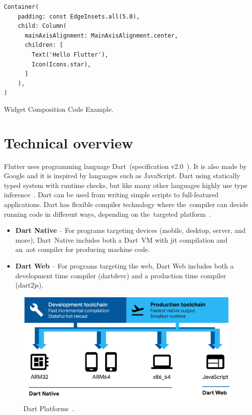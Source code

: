 \begin{listing}[ht]
\begin{verbatim}
Container(
    padding: const EdgeInsets.all(5.0),
    child: Column(
      mainAxisAlignment: MainAxisAlignment.center,
      children: [
        Text('Hello Flutter'),
        Icon(Icons.star),
      ]
    ),
)
\end{verbatim}
\caption{Widget Composition Code Example.}
\label{listing:hello-flutter}
\end{listing}
\section{Technical overview}
Flutter uses programming language Dart~(specification v2.0~\cite{dart-specs}). It is also made by Google and it is inspired by languages such as JavaScript. Dart using statically typed system with runtime checks, but like many other languages highly use type inference~\cite{dart-type-system}. Dart can be used from writing simple scripts to full-featured applications. Dart has flexible compiler technology where the~compiler can decide running code in different ways, depending on the~targeted platform~\cite{dart-platforms}. 

\begin{itemize}
    \item \textbf{Dart Native} -- For programs targeting devices (mobile, desktop, server, and more), Dart~Native includes both a Dart~VM with \gls{jit} compilation and an~\gls{aot} compiler for producing machine code.
    \item \textbf{Dart Web} -- For programs targeting the web, Dart Web includes both a development time compiler (dartdevc) and a production time compiler (dart2js).
\end{itemize}

\begin{figure}[htp]
    \centering
    \includegraphics[width=0.8\linewidth]{img/flutter/dart-platforms.pdf}
    \caption{Dart Platforms~\cite{dart-platforms}.}
    \label{fig:dart-platform}
\end{figure}

